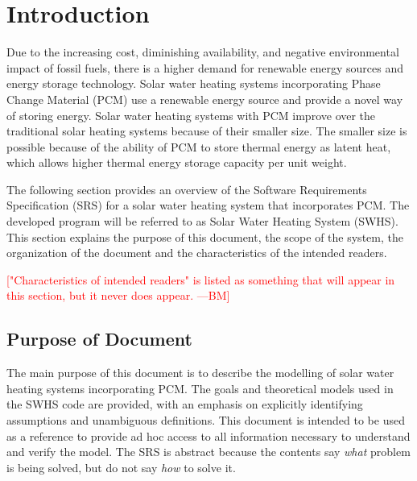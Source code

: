 \documentclass[12pt]{article}
\newcommand{\authornote}[3]{\textcolor{#1}{[#3 ---#2]}}
\newcommand{\authornote}[3]{}
\newcommand{\bmac}[1]{\authornote{red}{BM}{#1}}
\newcommand{\progname}{SWHS}
\begin{document}
\section{Introduction}

Due to the increasing cost, diminishing availability, and negative environmental
impact of fossil fuels, there is a higher demand for renewable energy sources
and energy storage technology.  Solar water heating systems incorporating Phase
Change Material (PCM) use a renewable energy source and provide a novel way of
storing energy.  Solar water heating systems with PCM improve over the
traditional solar heating systems because of their smaller size.  The smaller
size is possible because of the ability of PCM to store thermal energy as latent
heat, which allows higher thermal energy storage capacity per unit weight.





The following section provides an overview of the Software Requirements
Specification (SRS) for a solar water heating system that incorporates PCM.  The
developed program will be referred to as Solar Water Heating System 
(\progname{}).  This section explains the purpose of this document, the scope 
of the system, the organization of the document and the characteristics of the 
intended readers.

\bmac{"Characteristics of intended readers" is listed as something that will appear in this section, but it never does appear.}

\subsection{Purpose of Document}

The main purpose of this document is to describe the modelling of solar water
heating systems incorporating PCM.  The goals and theoretical models used in the 
\progname{} code are provided, with an emphasis on explicitly identifying 
assumptions and unambiguous definitions.  This document is intended to be used 
as a reference to provide ad hoc access to all information necessary to 
understand and verify the model.  The SRS is abstract because the contents say
\emph{what} problem is being solved, but do not say \emph{how} to solve it.
\end{document}
